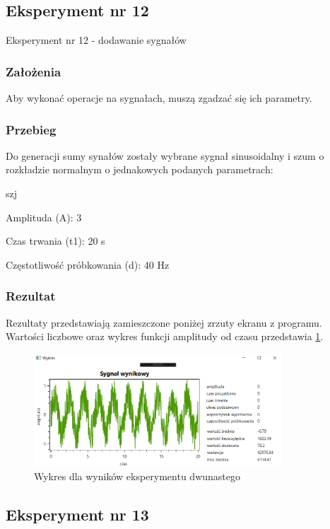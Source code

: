 \documentclass[12pt]{article}
\begin{document}
\subsection{Eksperyment nr 12}

Eksperyment nr 12 - dodawanie sygnałów

\subsubsection{Założenia}
Aby wykonać operacje na sygnałach, muszą zgadzać się ich parametry.

\subsubsection{Przebieg}
Do generacji sumy synałów zostały wybrane sygnał sinusoidalny i szum o rozkładzie normalnym o jednakowych podanych parametrach:

\begin{labeling}{szj}
\item [Amplituda (A):] 3
\item [Czas trwania (t1):] 20 s
\item [Częstotliwość próbkowania (d): ] 40 Hz
\end{labeling}

\subsubsection{Rezultat}
Rezultaty przedstawiają zamieszczone poniżej zrzuty ekranu z programu. Wartości liczbowe oraz wykres funkcji amplitudy od czasu przedstawia \ref{Wykres dla wyników eksperymentu dwunastego}.
\begin{figure}[h!]
 \centering
 \includegraphics[width=9.3cm]{DodawanieSinRozkA3t120d40h5.png}
 \vspace{-0.3cm}
 \caption{Wykres dla wyników eksperymentu dwunastego}
 \label{Wykres dla wyników eksperymentu dwunastego}
\end{figure}

\subsection{Eksperyment nr 13}
\end{document}
